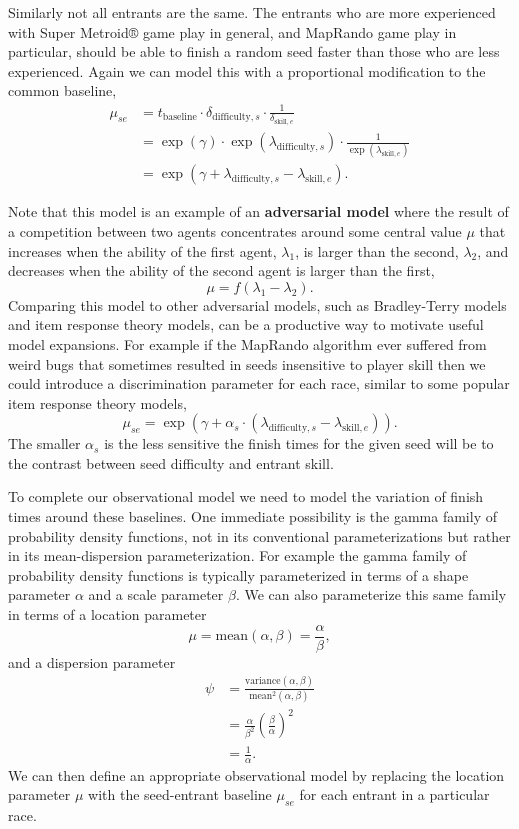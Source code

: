 \documentclass[
  letterpaper,
  DIV=11,
  numbers=noendperiod]{scrartcl}
\begin{document}
Similarly not all entrants are the same. The entrants who are more
experienced with Super Metroid® game play in general, and MapRando game
play in particular, should be able to finish a random seed faster than
those who are less experienced. Again we can model this with a
proportional modification to the common baseline, \begin{align*}
\mu_{se}
&=
t_{\mathrm{baseline}}
\cdot \delta_{\mathrm{difficulty}, s}
\cdot \frac{1}{\delta_{\mathrm{skill}, e}}
\\
&=
\exp(\gamma)
\cdot \exp( \lambda_{\mathrm{difficulty}, s} )
\cdot \frac{1}{\exp( \lambda_{\mathrm{skill}, e} ) }
\\
&=
\exp(\gamma + \lambda_{\mathrm{difficulty}, s} - \lambda_{\mathrm{skill}, e}).
\end{align*}

Note that this model is an example of an \textbf{adversarial model}
where the result of a competition between two agents concentrates around
some central value \(\mu\) that increases when the ability of the first
agent, \(\lambda_{1}\), is larger than the second, \(\lambda_{2}\), and
decreases when the ability of the second agent is larger than the first,
\[
\mu = f( \lambda_{1} - \lambda_{2} ).
\] Comparing this model to other adversarial models, such as
Bradley-Terry models and item response theory models, can be a
productive way to motivate useful model expansions. For example if the
MapRando algorithm ever suffered from weird bugs that sometimes resulted
in seeds insensitive to player skill then we could introduce a
discrimination parameter for each race, similar to some popular item
response theory models, \[
\mu_{se}
=
\exp(
\gamma
+ \alpha_{s} \cdot (  \lambda_{\mathrm{difficulty}, s}
                    - \lambda_{\mathrm{skill}, e}) ).
\] The smaller \(\alpha_{s}\) is the less sensitive the finish times for
the given seed will be to the contrast between seed difficulty and
entrant skill.

To complete our observational model we need to model the variation of
finish times around these baselines. One immediate possibility is the
gamma family of probability density functions, not in its conventional
parameterizations but rather in its mean-dispersion parameterization.
For example the gamma family of probability density functions is
typically parameterized in terms of a shape parameter \(\alpha\) and a
scale parameter \(\beta\). We can also parameterize this same family in
terms of a location parameter \[
\mu = \text{mean}(\alpha, \beta) = \frac{\alpha}{\beta},
\] and a dispersion parameter \begin{align*}
\psi
&=
\frac{ \text{variance}(\alpha, \beta) }{ \text{mean}^{2}(\alpha, \beta) }
\\
&=
\frac{\alpha}{\beta^{2}} \left( \frac{\beta}{\alpha} \right)^{2}
\\
&=
\frac{1}{\alpha}.
\end{align*} We can then define an appropriate observational model by
replacing the location parameter \(\mu\) with the seed-entrant baseline
\(\mu_{se}\) for each entrant in a particular race.
\end{document}
